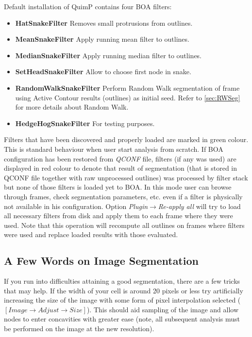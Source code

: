\documentclass[a4paper,12pt]{article}
\begin{document}
Default installation of QuimP contains four BOA filters:
\begin{itemize}
	\item \textbf{HatSnakeFilter} Removes small protrusions from outlines.
	\item \textbf{MeanSnakeFilter} Apply running mean filter to outlines.
	\item \textbf{MedianSnakeFilter} Apply running median filter to outlines.
	\item \textbf{SetHeadSnakeFilter} Allow to choose first node in snake.
	\item \textbf{RandomWalkSnakeFilter} Perform Random Walk segmentation of frame using Active Contour results (outlines) as initial seed. Refer to \autoref{sec:RWSeg} for more details about Random Walk.
	\item \textbf{HedgeHogSnakeFilter} For testing purposes.
\end{itemize}

Filters that have been discovered and properly loaded are marked in green colour. This is standard behaviour when user start analysis from scratch. If BOA configuration has been restored from \textit{QCONF} file, filters (if any was used) are displayed in red colour to denote that result of segmentation (that is stored in QCONF file together with raw unprocessed outlines) was processed by filter stack but none of those filters is loaded yet to BOA. In this mode user can browse through frames, check segmentation parameters, etc. even if a filter is physically not available in his configuration. Option \textit{Plugin}$\rightarrow$\textit{Re-apply all} will try to load all necessary filters from disk and apply them to each frame where they were used. Note that this operation will recompute all outlines on frames where filters were used and replace loaded results with those evaluated. 

\subsection{A Few Words on Image Segmentation}

If you run into difficulties attaining a good segmentation, there are a few tricks that may help.  If the width of your cell is around 20 pixels or less
try artificially increasing the size of the image with some form of pixel interpolation selected ($[Image \rightarrow Adjust \rightarrow Size]$).
This should aid sampling of the image and allow nodes to enter concavities with greater ease (note, all subsequent analysis
must be performed on the image at the new resolution).
\end{document}
